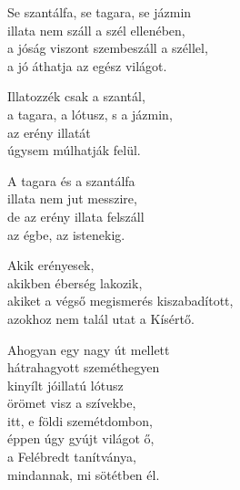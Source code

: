 \begin{dhpverse}

 Se szantálfa, se tagara, se jázmin\\
illata nem száll a szél ellenében,\\
a jóság viszont szembeszáll a széllel,\\
a jó áthatja az egész világot.

 Illatozzék csak a szantál,\\
a tagara, a lótusz, s a jázmin,\\
az erény illatát\\
úgysem múlhatják felül.

 A tagara és a szantálfa\\
illata nem jut messzire,\\
de az erény illata felszáll\\
az égbe, az istenekig.

 Akik erényesek,\\
akikben éberség lakozik,\\
akiket a végső megismerés kiszabadított,\\
azokhoz nem talál utat a Kísértő.

 Ahogyan egy nagy út mellett\\
hátrahagyott szeméthegyen\\
kinyílt jóillatú lótusz\\
örömet visz a szívekbe,\\
itt, e földi szemétdombon,\\
éppen úgy gyújt világot ő,\\
a Felébredt tanítványa,\\
mindannak, mi sötétben él.

\end{dhpverse}

